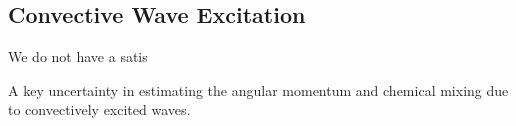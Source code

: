 {\color{purple}
\subsection{Convective Wave Excitation}
}

We do not have a satis

A key uncertainty in estimating the angular momentum and chemical mixing due to convectively excited waves.
